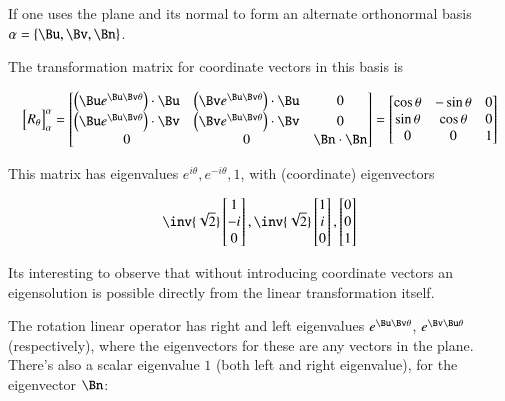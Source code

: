 If one uses the plane and its normal to form an alternate orthonormal basis 
$\alpha = \{\Bu, \Bv, \Bn\}$.

The transformation matrix for coordinate vectors in this basis is

\[
{
\begin{bmatrix}
R_\theta
\end{bmatrix}
}_\alpha^\alpha
=
\begin{bmatrix}
\left(\Bu e^{\Bu\Bv \theta}\right) \cdot \Bu & \left(\Bv e^{\Bu\Bv \theta}\right) \cdot \Bu & 0 \\
\left(\Bu e^{\Bu\Bv \theta}\right) \cdot \Bv & \left(\Bv e^{\Bu\Bv \theta}\right) \cdot \Bv & 0 \\
0 & 0 & \Bn\cdot\Bn \\
\end{bmatrix}
=
\begin{bmatrix}
\cos\theta & -\sin\theta & 0 \\
\sin\theta & \cos\theta & 0 \\
0 & 0 & 1 \\
\end{bmatrix}
\]

This matrix has eigenvalues $e^{i\theta}, e^{-i\theta}, 1$, with (coordinate) eigenvectors

\[
\inv{\sqrt{2}}
\begin{bmatrix}
1 \\
-i \\
0 \\
\end{bmatrix},
\inv{\sqrt{2}}
\begin{bmatrix}
1 \\
i \\
0 \\
\end{bmatrix},
\begin{bmatrix}
0 \\
0 \\
1 \\
\end{bmatrix}
\]

Its interesting to observe that without introducing coordinate vectors an eigensolution is possible directly from
the linear transformation itself.

The rotation linear operator has right and left eigenvalues $e^{\Bu\Bv \theta}$, $e^{\Bv\Bu \theta}$ (respectively), where the eigenvectors for these are any vectors in the plane.  There's also a scalar eigenvalue $1$ (both left and right eigenvalue), for the eigenvector $\Bn$:

